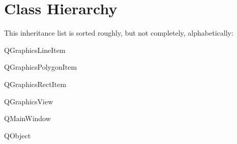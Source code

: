 \section{Class Hierarchy}
This inheritance list is sorted roughly, but not completely, alphabetically\+:\begin{DoxyCompactList}
\item {}
\item Q\+Graphics\+Line\+Item\begin{DoxyCompactList}
\item {}
\end{DoxyCompactList}
\item Q\+Graphics\+Polygon\+Item\begin{DoxyCompactList}
\item {}
\end{DoxyCompactList}
\item Q\+Graphics\+Rect\+Item\begin{DoxyCompactList}
\item {}
\end{DoxyCompactList}
\item Q\+Graphics\+View\begin{DoxyCompactList}
\item {}
\end{DoxyCompactList}
\item Q\+Main\+Window\begin{DoxyCompactList}
\item {}
\end{DoxyCompactList}
\item Q\+Object\begin{DoxyCompactList}
\item {}
\item {}
\item {}
\end{DoxyCompactList}
\item {}

\end{DoxyCompactList}
